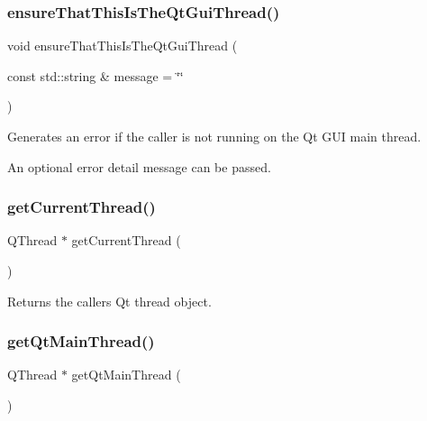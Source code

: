 \subsubsection{\texorpdfstring{ensure\+That\+This\+Is\+The\+Qt\+Gui\+Thread()}{ensureThatThisIsTheQtGuiThread()}}
{\footnotesize\ttfamily void ensure\+That\+This\+Is\+The\+Qt\+Gui\+Thread (\begin{DoxyParamCaption}\item[{const std\+::string \&}]{message = {\ttfamily \char`\"{}\char`\"{}} }\end{DoxyParamCaption})\hspace{0.3cm}{\ttfamily [static]}}



Generates an error if the caller is not running on the Qt G\+UI main thread. 

An optional error detail message can be passed. \mbox{\label{classGThread_a7bf03645e8eb0dd26b54b4e48b5206e1}} 
\subsubsection{\texorpdfstring{get\+Current\+Thread()}{getCurrentThread()}}
{\footnotesize\ttfamily Q\+Thread $\ast$ get\+Current\+Thread (\begin{DoxyParamCaption}{ }\end{DoxyParamCaption})\hspace{0.3cm}{\ttfamily [static]}}



Returns the caller\textquotesingle{}s Qt thread object. 

\mbox{\label{classGThread_ad1309b5071a8c56775d3c82a6d8ccd4d}} 
\subsubsection{\texorpdfstring{get\+Qt\+Main\+Thread()}{getQtMainThread()}}
{\footnotesize\ttfamily Q\+Thread $\ast$ get\+Qt\+Main\+Thread (\begin{DoxyParamCaption}{ }\end{DoxyParamCaption})\hspace{0.3cm}{\ttfamily [static]}}




